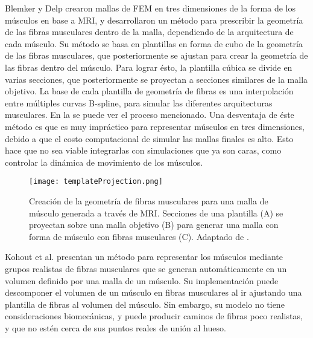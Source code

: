 Blemker y Delp \citep{blemker2005three} crearon mallas de FEM en tres dimensiones de la forma de los músculos en base a MRI, y desarrollaron un método para prescribir la geometría de las fibras musculares dentro de la malla, dependiendo de la arquitectura de cada músculo. Su método se basa en plantillas en forma de cubo de la geometría de las fibras musculares, que posteriormente se ajustan para crear la geometría de las fibras dentro del músculo. Para lograr ésto, la plantilla cúbica se divide en varias secciones, que posteriormente se proyectan a secciones similares de la malla objetivo. La base de cada plantilla de geometría de fibras es una interpolación entre múltiples curvas B-spline, para simular las diferentes arquitecturas musculares. En la  se puede ver el proceso mencionado. Una desventaja de éste método es que es muy impráctico para representar músculos en tres dimensiones, debido a que el costo computacional de simular las mallas finales es alto. Esto hace que no sea viable integrarlas con simulaciones que ya son caras, como controlar la dinámica de movimiento de los músculos.

\begin{figure}
	\centering
		\texttt{[image: templateProjection.png]}
	\caption[Generación de geometría de fibras a través de plantillas.]{Creación de la geometría de fibras musculares para una malla de músculo generada a través de MRI. Secciones de una plantilla (A) se proyectan sobre una malla objetivo (B) para generar una malla con forma de músculo con fibras musculares (C). Adaptado de \citep{blemker2005three}.}
		\label{fig:templateProjection}
\end{figure}

Kohout et al. \citep{kohout2012muscle} presentan un método para representar los músculos mediante grupos realistas de fibras musculares que se generan automáticamente en un volumen definido por una malla de un músculo. Su implementación puede descomponer el volumen de un músculo en fibras musculares al ir ajustando una plantilla de fibras al volumen del músculo. Sin embargo, su modelo no tiene consideraciones biomecánicas, y puede producir caminos de fibras poco realistas, y que no estén cerca de sus puntos reales de unión al hueso.

